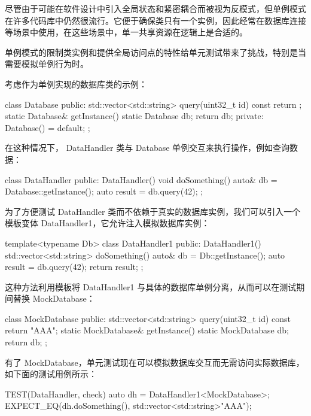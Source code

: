 
尽管由于可能在软件设计中引入全局状态和紧密耦合而被视为反模式，但单例模式在许多代码库中仍然很流行。它便于确保类只有一个实例，因此经常在数据库连接等场景中使用，在这些场景中，单一共享资源在逻辑上是合适的。

单例模式的限制类实例和提供全局访问点的特性给单元测试带来了挑战，特别是当需要模拟单例行为时。

考虑作为单例实现的数据库类的示例：

\begin{cpp}
class Database {
public:
    std::vector<std::string> query(uint32_t id) const {
        return {};
    }
    static Database& getInstance() {
        static Database db;
        return db;
    }
private:
    Database() = default;
};
\end{cpp}

在这种情况下， DataHandler 类与 Database 单例交互来执行操作，例如查询数据：

\begin{cpp}
class DataHandler {
public:
    DataHandler() {}
    void doSomething() {
        auto& db = Database::getInstance();
        auto result = db.query(42);
    }
};
\end{cpp}

为了方便测试 DataHandler 类而不依赖于真实的数据库实例，我们可以引入一个模板变体 DataHandler1，它允许注入模拟数据库实例：

\begin{cpp}
template<typename Db>
class DataHandler1 {
public:
    DataHandler1() {}
    std::vector<std::string> doSomething() {
        auto& db = Db::getInstance();
        auto result = db.query(42);
        return result;
    }
};
\end{cpp}

这种方法利用模板将 DataHandler1 与具体的数据库单例分离，从而可以在测试期间替换 MockDatabase：

\begin{cpp}
class MockDatabase {
public:
    std::vector<std::string> query(uint32_t id) const {
        return {"AAA"};
    }
    static MockDatabase& getInstance() {
        static MockDatabase db;
        return db;
    }
};
\end{cpp}

有了 MockDatabase，单元测试现在可以模拟数据库交互而无需访问实际数据库，如下面的测试用例所示：

\begin{cpp}
TEST(DataHandler, check) {
    auto dh = DataHandler1<MockDatabase>{};
    EXPECT_EQ(dh.doSomething(), std::vector<std::string>{"AAA"});
}
\end{cpp}

